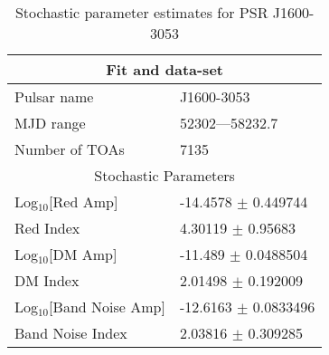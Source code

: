 \documentclass{article}
\begin{document}
\begin{table*}
\caption{Stochastic parameter estimates for PSR J1600-3053}
\begin{tabular}{ll}
\hline\hline
\multicolumn{2}{c}{Fit and data-set} \\ 
\hline
Pulsar name\dotfill & J1600-3053 \\ 
MJD range\dotfill & 52302---58232.7 \\ 
Number of TOAs\dotfill & 7135 \\
\hline
\multicolumn{2}{c}{Stochastic Parameters} \\ 
\hline
Log$_{10}$[Red Amp] \dotfill & -14.4578 $\pm$ 0.449744  \\ 
Red Index \dotfill & 4.30119 $\pm$ 0.95683  \\ 
Log$_{10}$[DM Amp] \dotfill & -11.489 $\pm$ 0.0488504  \\ 
DM Index \dotfill & 2.01498 $\pm$ 0.192009  \\ 
Log$_{10}$[Band Noise Amp] \dotfill & -12.6163 $\pm$ 0.0833496  \\ 
Band Noise Index \dotfill & 2.03816 $\pm$ 0.309285  \\ 
\hline
\end{tabular}
\label{Table:J1600-3053}
\end{table*} 
\end{document}
